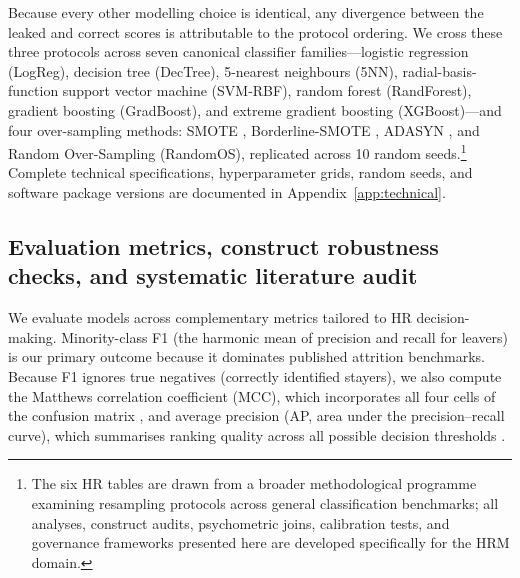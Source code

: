\documentclass[12pt,a4paper]{article}
\begin{document}
Because every other modelling choice is identical, any divergence between the leaked and correct scores is attributable to the protocol ordering. We cross these three protocols across seven canonical classifier families---logistic regression (LogReg), decision tree (DecTree), 5-nearest neighbours (5NN), radial-basis-function support vector machine (SVM-RBF), random forest (RandForest), gradient boosting (GradBoost), and extreme gradient boosting (XGBoost)---and four over-sampling methods: SMOTE \parencite{ref5}, Borderline-SMOTE \parencite{ref6}, ADASYN \parencite{ref7}, and Random Over-Sampling (RandomOS), replicated across 10 random seeds.\footnote{The six HR tables are drawn from a broader methodological programme examining resampling protocols across general classification benchmarks; all analyses, construct audits, psychometric joins, calibration tests, and governance frameworks presented here are developed specifically for the HRM domain.} Complete technical specifications, hyperparameter grids, random seeds, and software package versions are documented in Appendix~\ref{app:technical}.

\subsection{Evaluation metrics, construct robustness checks, and systematic literature audit}
We evaluate models across complementary metrics tailored to HR decision-making. Minority-class F1 (the harmonic mean of precision and recall for leavers) is our primary outcome because it dominates published attrition benchmarks. Because F1 ignores true negatives (correctly identified stayers), we also compute the Matthews correlation coefficient (MCC), which incorporates all four cells of the confusion matrix \parencite{ref17}, and average precision (AP, area under the precision--recall curve), which summarises ranking quality across all possible decision thresholds \parencite{ref30,ref37}.
\end{document}
